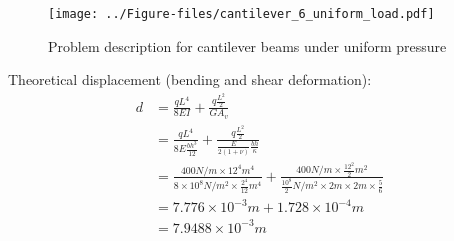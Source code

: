 \documentclass[fleqn,11pt]{article}
\begin{document}
\begin{figure}[H]
  \centering
  \texttt{[image: ../Figure-files/cantilever\_6\_uniform\_load.pdf]}
  \caption{Problem description for cantilever beams under uniform pressure  }
  \label{fig Problem description for cantilever beams under uniform pressure 4}
\end{figure}


Theoretical displacement (bending and shear deformation):
\begin{equation}
  \begin{aligned}
  d &=\frac{qL^4}{8EI} + \frac{q \frac{L^2}{2}}{GA_v} \\ 
    &=\frac{qL^4}{8E\frac{bh^3}{12} }+\frac{q \frac{L^2}{2}}{\frac{E}{2(1+\nu)}\frac{bh}{\kappa}} \\
    &= \frac{400 N/m \times 12^4 m^4}{8\times 10^8 N/m^2 \times \frac{2^4}{12} m^4} 
       + \frac{400 N/m \times \frac{12^2}{2} m^2} {\frac{10^8}{2} N/m^2 \times 2m\times 2m\times \frac{5}{6}} \\ 
    &=7.776\times 10^{-3} m  +1.728\times 10^{-4}  m \\
    &=7.9488\times 10^{-3} m
   \end{aligned}
\end{equation}
\end{document}
